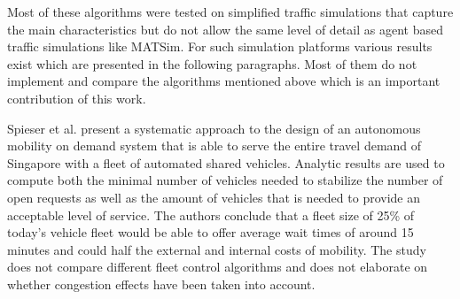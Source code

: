 Most of these algorithms were tested on simplified traffic simulations that capture
the main characteristics but do not allow the same level of detail as agent based
traffic simulations like MATSim. For such simulation platforms various results
exist which are presented in the following paragraphs. Most of them do not
implement and compare the algorithms mentioned above which is an important
contribution of this work.

Spieser et al. \cite{spieser2014toward} present a systematic approach to the
design of an autonomous mobility on demand system that is able to serve the entire
travel demand of Singapore with a fleet of automated shared vehicles. Analytic
results are used to compute both the minimal number of vehicles needed to stabilize
the number of open requests as well as the amount of vehicles that is needed to
provide an acceptable level of service. The authors conclude that a fleet size
of 25\% of today's vehicle fleet would be able to offer average wait times of
around 15 minutes and could half the external and internal costs of mobility.
The study does not compare different fleet control algorithms and does not
elaborate on whether congestion effects have been taken into account.


